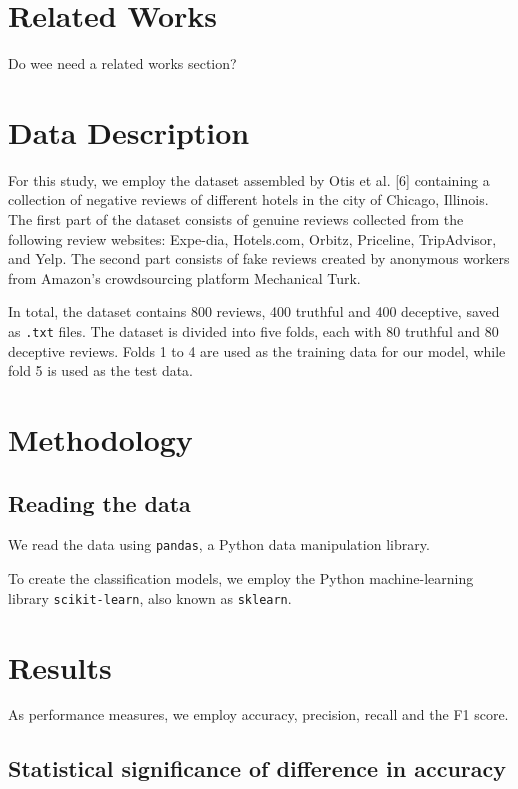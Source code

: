 \documentclass[a4paper,11pt]{article}
\begin{document}
\section{Related Works}
Do wee need a related works section?

\section{Data Description}

For this study, we employ the dataset assembled by Otis et al. [6] containing a collection of negative reviews of different hotels in the city of Chicago, Illinois. The first part of the dataset consists of genuine reviews collected from the following review websites: Expe-dia, Hotels.com, Orbitz, Priceline, TripAdvisor, and Yelp. The second part consists of fake reviews created by anonymous workers from Amazon's crowdsourcing platform Mechanical Turk.   

In total, the dataset contains 800 reviews, 400 truthful and 400 deceptive, saved as \texttt{.txt} files. The dataset is divided into five folds, each with 80 truthful and 80 deceptive reviews. Folds 1 to 4 are used as the training data for our model, while fold 5 is used as the test data. 



\section{Methodology}

\subsection{Reading the data}

We read the data using \texttt{pandas}, a Python data manipulation library. 



To create the classification models, we employ the Python machine-learning library \texttt{scikit-learn}, also known as \texttt{sklearn}.

\section{Results}

As performance measures, we employ accuracy, precision, recall and the F1 score.

\subsection{Statistical significance of difference in accuracy}
\end{document}
